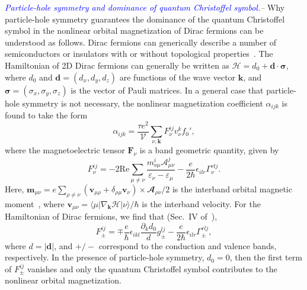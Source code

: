 \documentclass[aps,prl,twocolumn,amsmath,amssymb,showpacs, superscriptaddress,notitlepage,longbibliography,10pt]{revtex4-1}
\begin{document}
\textit{\textcolor{blue}{Particle-hole symmetry and dominance of quantum Christoffel symbol.}--}
Why particle-hole symmetry guarantees the dominance of the quantum Christoffel symbol in the nonlinear orbital magnetization of Dirac fermions can be understood as follows. Dirac fermions can generically describe a number of semiconductors or insulators with or without topological properties~\cite{Shen17book}. The Hamiltonian of 2D Dirac fermions can generally be written as $\mathcal{H} = d_0 + \mathbf{d} \cdot \boldsymbol{\sigma}$, where $d_0$ and $\mathbf{d} = (d_x, d_y, d_z)$ are functions of the wave vector $\mathbf{k}$, and $\boldsymbol{\sigma} = (\sigma_x, \sigma_y, \sigma_z)$ is the vector of Pauli matrices. In a general case that particle-hole symmetry is not necessary, the nonlinear magnetization coefficient $\alpha_{ijk}$ is found to take the form
\begin{equation}\label{Eq: alpha_full}
\alpha_{ijk} =\frac{\tau e^2}{\mathcal{V}}\sum_{\nu,\mathbf{k}} F_\nu^{ij} v_\nu^k f_0',
\end{equation}
where the magnetoelectric tensor $\mathbf{F}_\nu$
is a band geometric quantity, given by
\begin{equation}\label{Eq: MET}
F_\nu^{ij}=-2\text{Re} \sum_{\mu \neq \nu} \frac{m_{\nu \mu}^i \mathcal{A}_{\mu \nu}^j}{\varepsilon_\nu-\varepsilon_\mu}
-\frac{e}{2\hbar}\epsilon_{ilr}\Gamma_\nu^{rlj}.
\end{equation}
Here, $\mathbf{m}_{\mu\nu}=e\sum_{\rho\neq \nu}(\boldsymbol{v}_{\mu \rho}+\delta_{\rho\mu }\boldsymbol{v}_\nu)\times \mathbfcal{A}_{\rho\nu}/2$ is the interband orbital magnetic moment~\cite{GaoY14prl,YangSY24prl}, where $\boldsymbol{v}_{\mu \nu}=\langle \mu| \nabla_\mathbf{k} \mathcal{H} | \nu \rangle/\hbar$ is the interband velocity. For the Hamiltonian of Dirac fermions, we find that (Sec.~IV of~\cite{Supp}),
\begin{equation}
F_{\pm}^{ij}=\mp\frac{e}{\hbar} \epsilon_{ikl}\frac{\partial_k d_0}{d}
g_{\pm}^{l j}-\frac{e}{2\hbar}\epsilon_{ilr}\Gamma_\pm^{rlj},
\end{equation}
where $d = |\mathbf{d}|$, and $+/-$ correspond to the conduction and valence bands, respectively. In the presence of particle-hole symmetry, $d_0 = 0$, then the first term of $F_{\pm}^{ij}$ vanishes and only the quantum Christoffel symbol contributes to the nonlinear orbital magnetization.
\end{document}
